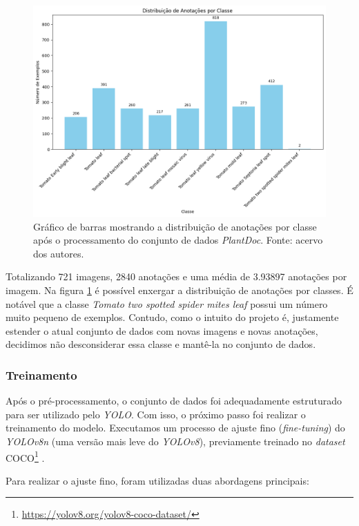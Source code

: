 \begin{figure}[htb!]
    \centering
    \includegraphics[width=1\linewidth]{images/distribuicao_anotacoes.png}
    \caption{\label{fig:distribuicao-ann-cls} Gráfico de barras mostrando a distribuição de anotações por classe após o processamento do conjunto de dados \emph{PlantDoc}. Fonte: acervo dos autores.}
\end{figure}

Totalizando 721 imagens, 2840 anotações e uma média de 3.93897 anotações por imagem. Na figura \ref{fig:distribuicao-ann-cls} é possível enxergar a distribuição de anotações por classes. É notável que a classe \emph{Tomato two spotted spider mites leaf} possui um número muito pequeno de exemplos. Contudo, como o intuito do projeto é, justamente estender o atual conjunto de dados com novas imagens e novas anotações, decidimos não desconsiderar essa classe e mantê-la no conjunto de dados.

\subsubsection{Treinamento}
\label{sec:treinamento2}
Após o pré-processamento, o conjunto de dados foi adequadamente estruturado para ser utilizado pelo \emph{YOLO}. Com isso, o próximo passo foi realizar o treinamento do modelo. Executamos um processo de ajuste fino (\emph{fine-tuning}) do \emph{YOLOv8n} (uma versão mais leve do \emph{YOLOv8}), previamente treinado no \emph{dataset} COCO\footnote{\url{https://yolov8.org/yolov8-coco-dataset/}} \cite{COCO}.

Para realizar o ajuste fino, foram utilizadas duas abordagens principais:

